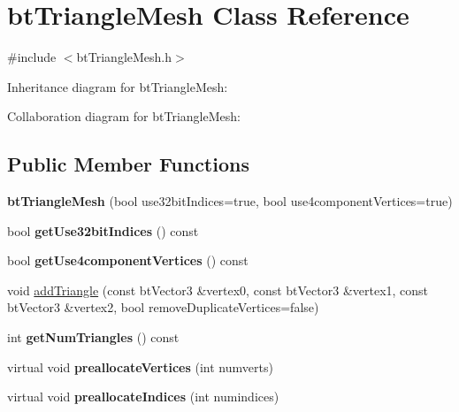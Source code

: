 \hypertarget{classbt_triangle_mesh}{\section{bt\+Triangle\+Mesh Class Reference}
\label{classbt_triangle_mesh}
}


{\ttfamily \#include $<$bt\+Triangle\+Mesh.\+h$>$}



Inheritance diagram for bt\+Triangle\+Mesh\+:


Collaboration diagram for bt\+Triangle\+Mesh\+:
\subsection*{Public Member Functions}
\begin{DoxyCompactItemize}
\item 
\hypertarget{classbt_triangle_mesh_a686eefc0978d30da88bdc43c6d75589f}{{\bfseries bt\+Triangle\+Mesh} (bool use32bit\+Indices=true, bool use4component\+Vertices=true)}\label{classbt_triangle_mesh_a686eefc0978d30da88bdc43c6d75589f}

\item 
\hypertarget{classbt_triangle_mesh_afe4323b324f4f9b2d92dc7b12605a1ec}{bool {\bfseries get\+Use32bit\+Indices} () const }\label{classbt_triangle_mesh_afe4323b324f4f9b2d92dc7b12605a1ec}

\item 
\hypertarget{classbt_triangle_mesh_a43c59b2b1ab69b604719df03f14ba8a1}{bool {\bfseries get\+Use4component\+Vertices} () const }\label{classbt_triangle_mesh_a43c59b2b1ab69b604719df03f14ba8a1}

\item 
void \hyperlink{classbt_triangle_mesh_a28551d57ae59248a210163a504558583}{add\+Triangle} (const bt\+Vector3 \&vertex0, const bt\+Vector3 \&vertex1, const bt\+Vector3 \&vertex2, bool remove\+Duplicate\+Vertices=false)
\item 
\hypertarget{classbt_triangle_mesh_a75a628f1c34f6cc391e30a84d6047af6}{int {\bfseries get\+Num\+Triangles} () const }\label{classbt_triangle_mesh_a75a628f1c34f6cc391e30a84d6047af6}

\item 
\hypertarget{classbt_triangle_mesh_a8c1ca8fdf198eee1812e3efe9e0098b5}{virtual void {\bfseries preallocate\+Vertices} (int numverts)}\label{classbt_triangle_mesh_a8c1ca8fdf198eee1812e3efe9e0098b5}

\item 
\hypertarget{classbt_triangle_mesh_a0b2aee6bf89eecbf2a2b955253e62b7d}{virtual void {\bfseries preallocate\+Indices} (int numindices)}\label{classbt_triangle_mesh_a0b2aee6bf89eecbf2a2b955253e62b7d}


\end{DoxyCompactItemize}
